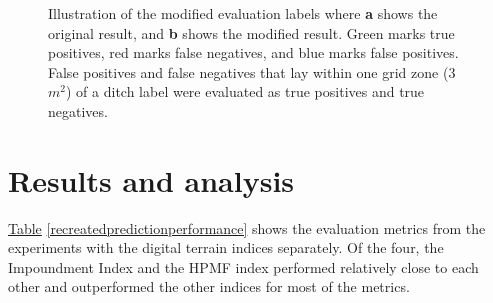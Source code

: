 \documentclass[]{interact}
\theoremstyle{plain}%
\theoremstyle{definition}
\theoremstyle{remark}
\begin{document}
\begin{figure} [!htb]
{        }
    \caption{Illustration of the modified evaluation labels where \textbf{a} shows the original result, and \textbf{b} shows the modified result. Green marks true positives, red marks false negatives, and blue marks false positives. False positives and false negatives that lay within one grid zone (3 $m^2$) of a ditch label were evaluated as true positives and true negatives.}
    \label{fig:newlabels}
\end{figure}

\section{Results and analysis}

\hyperref[recreatedpredictionperformance]{Table} \ref{recreatedpredictionperformance} shows the evaluation metrics from the experiments with the digital terrain indices separately. Of the four, the Impoundment Index and the HPMF index performed relatively close to each other and outperformed the other indices for most of the metrics.
\end{document}
